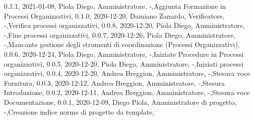 {    {0.1.1, 2021-01-08, Piola Diego, Amministratore, -,Aggiunta Formazione in Processi Organizzativi},
    {0.1.0, 2020-12-20, Damiano Zanardo, Verificatore, -,Verifica processi organizzativi},
    {0.0.8, 2020-12-20, Piola Diego, Amministratore, -,Fine processi organizzativi},
    {0.0.7, 2020-12-26, Piola Diego, Amministratore, -,Mancante gestione degli strumenti di coordinazione (Processi Organizzativi)},
    {0.0.6, 2020-12-24, Piola Diego, Amministratore, -,Iniziate Procedure in Processi organizzativi},
    {0.0.5, 2020-12-20, Piola Diego, Amministratore, -,Iniziati processi organizzativi},
    {0.0.4, 2020-12-20, Andrea Breggion, Amministratore, -,Stesura voce Fornitura},
    {0.0.3, 2020-12-12, Andrea Breggion, Amministratore, -,Stesura Introduzione},
    {0.0.2, 2020-12-11, Andrea Breggion, Amministratore, -,Stesura voce Documentazione},
    {0.0.1, 2020-12-09, Diego Piola, Amministratore di progetto, -,Creazione indice norme di progetto da template},
}

